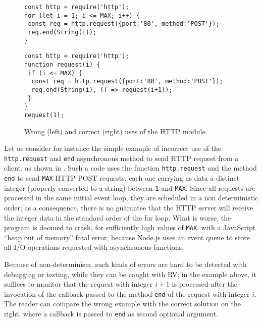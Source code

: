 \begin{figure}
\begin{minipage}{.5\linewidth}
\begin{lstlisting}
const http = require('http');
for (let i = 1; i <= MAX; i++) {
 const req = http.request({port:'80', method:'POST'});
 req.end(String(i));
}
\end{lstlisting}
\end{minipage}
\begin{minipage}{.5\linewidth}
\begin{lstlisting}
const http = require('http');
function request(i) {
 if (i <= MAX) {
  const req = http.request({port:'80', method:'POST'});
  req.end(String(i), () => request(i+1));
 }
}
request(1);
\end{lstlisting}
\end{minipage}
\caption{Wrong (left) and correct (right) uses of the HTTP module.}
\label{lst:wrongreq}
\end{figure}
Let us consider for instance the simple example of incorrect use of the \lstinline{http.request} and \lstinline{end} asynchronous method to send HTTP request from a client, as shown in .
%
%
Such a code uses the function \lstinline{http.request} and the method \lstinline{end} to send  \lstinline{MAX} HTTP POST requests,
each one carrying as data a distinct integer (properly converted to a string)
between \lstinline{1} and \lstinline{MAX}. Since all requests are processed in the same initial event loop, they are
scheduled in a non deterministic order; as a consequence, there is no guarantee that the HTTP server will receive
the integer data in the standard order of the for loop. What is worse, the program is doomed to crash, for sufficiently high values of
\lstinline{MAX}, with a JavaScript ``heap out of memory'' fatal error, because Node.js uses an event queue to store all I/O operations
requested with asynchronous functions.

Because of non-determinism, such kinds of errors are hard to be detected with debugging or testing, while they can be caught with RV; in the example above, it suffices to monitor that the request with integer $i+1$ is processed after the invocation of the callback passed to the method \lstinline{end} of the request with integer $i$.
The reader can compare the wrong example with the correct solution on the right, where a callback is passed to \lstinline{end} as second optional argument.
%


